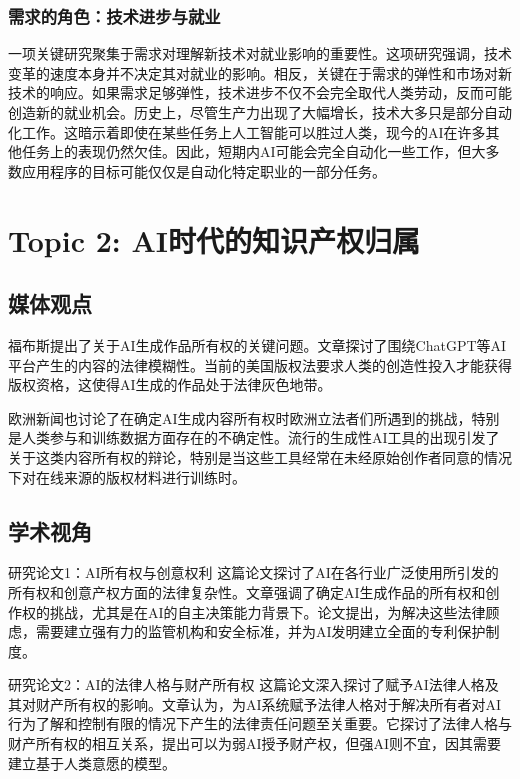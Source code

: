 \documentclass[11pt]{article}
\begin{document}
\subsubsection{需求的角色：技术进步与就业}
一项关键研究聚集于需求对理解新技术对就业影响的重要性。这项研究强调，技术变革的速度本身并不决定其对就业的影响。相反，关键在于需求的弹性和市场对新技术的响应。如果需求足够弹性，技术进步不仅不会完全取代人类劳动，反而可能创造新的就业机会。历史上，尽管生产力出现了大幅增长，技术大多只是部分自动化工作。这暗示着即使在某些任务上人工智能可以胜过人类，现今的AI在许多其他任务上的表现仍然欠佳。因此，短期内AI可能会完全自动化一些工作，但大多数应用程序的目标可能仅仅是自动化特定职业的一部分任务。

\section{Topic 2: AI时代的知识产权归属}

\subsection{媒体观点}

福布斯提出了关于AI生成作品所有权的关键问题。文章探讨了围绕ChatGPT等AI平台产生的内容的法律模糊性。当前的美国版权法要求人类的创造性投入才能获得版权资格，这使得AI生成的作品处于法律灰色地带。

欧洲新闻也讨论了在确定AI生成内容所有权时欧洲立法者们所遇到的挑战，特别是人类参与和训练数据方面存在的不确定性。流行的生成性AI工具的出现引发了关于这类内容所有权的辩论，特别是当这些工具经常在未经原始创作者同意的情况下对在线来源的版权材料进行训练时。

\subsection{学术视角}

研究论文1：AI所有权与创意权利
这篇论文探讨了AI在各行业广泛使用所引发的所有权和创意产权方面的法律复杂性。文章强调了确定AI生成作品的所有权和创作权的挑战，尤其是在AI的自主决策能力背景下。论文提出，为解决这些法律顾虑，需要建立强有力的监管机构和安全标准，并为AI发明建立全面的专利保护制度。

研究论文2：AI的法律人格与财产所有权
这篇论文深入探讨了赋予AI法律人格及其对财产所有权的影响。文章认为，为AI系统赋予法律人格对于解决所有者对AI行为了解和控制有限的情况下产生的法律责任问题至关重要。它探讨了法律人格与财产所有权的相互关系，提出可以为弱AI授予财产权，但强AI则不宜，因其需要建立基于人类意愿的模型。
\end{document}
